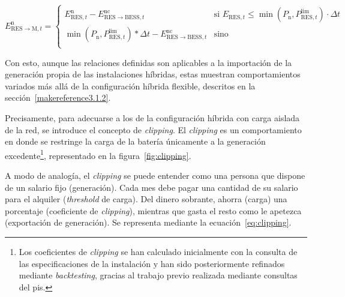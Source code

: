 \begin{equation}%
  \label{eq:res-export}
  E^{\mathrm{n}}_{\mathrm{RES} \rightarrow \mathrm{M}, t} =
  \begin{cases}
    E^{\mathrm{n}}_{\mathrm{RES}, t} - E^{\mathrm{nc}}_{\mathrm{RES} \rightarrow \mathrm{BESS}, t}                                             & \text{si } E_{\mathrm{RES}, t} \le \min\left(P_{\mathrm{n}}, P^{\text{lim}}_{\mathrm{RES}, t}\right) \cdot \Delta t \\
    \min\left(P_{\mathrm{n}}, P^{\text{lim}}_{\mathrm{RES}, t}\right) * \Delta t - E^{\mathrm{nc}}_{\mathrm{RES} \rightarrow \mathrm{BESS}, t} & \text{sino}                                                                                                         \\
  \end{cases}
\end{equation}

Con esto, aunque las relaciones definidas son aplicables a la importación de la generación propia de las instalaciones híbridas, estas muestran comportamientos variados más allá de la configuración híbrida flexible, descritos en la sección~\ref{makereference3.1.2}.

Precisamente, para adecuarse a los de la configuración híbrida con carga aislada de la red, se introduce el concepto de \textit{clipping}. El \textit{clipping} es un comportamiento en donde se restringe la carga de la batería únicamente a la generación excedente\footnote{Los coeficientes de \textit{clipping} se han calculado inicialmente con la consulta de las especificaciones de la instalación y han sido posteriormente refinados mediante \textit{backtesting}, gracias al trabajo previo realizada mediante consultas del \gls{pis}.}, representado en la figura~\ref{fig:clipping}.

A modo de analogía, el \textit{clipping} se puede entender como una persona que dispone de un salario fijo (generación). Cada mes debe pagar una cantidad de su salario para el alquiler (\textit{threshold} de carga). Del dinero sobrante, ahorra (carga) una porcentaje (coeficiente de \textit{clipping}), mientras que gasta el resto como le apetezca (exportación de generación). Se representa mediante la ecuación~\ref{eq:clipping}.

